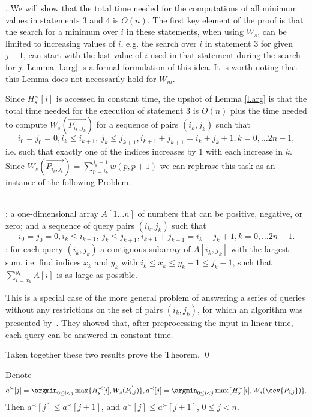.
We will show that the total time needed for the computations of all minimum values in statements 3 and 4 is $O(n)$.
The first key element of the proof is that the search for a minimum over $i$ 
in these statements, when using $W_s$, can be limited to increasing values of $i$, e.g. the search over $i$ in statement 3
for given $j+1$, can start with the last value of $i$ used in that statement during the 
search for $j$. Lemma \ref{l.arg} is a formal formulation of this idea.
It is worth noting that this Lemma does not necessarily hold for $W_m$.

Since $H_s^{\prec}[i]$ is accessed in constant time, the upshot of Lemma \ref{l.arg} 
is that the total time needed for the execution of statement 3 is $O(n)$ plus
the time needed to compute  $W_s(\vec{P_{i_k, j_k}})$ for a sequence  of pairs $(i_k,j_k)$ 
such that 
$$i_0=j_0=0, i_k\leq  i_{k+1},\  j_k \leq j_{k+1}, 
i_{k+1}+j_{k+1}=i_k+j_k+1,
k=0, \ldots 2n-1,$$
i.e. such that exactly one of the indices increases by 1 with each increase in $k$.
Since $W_s(\vec{P_{i_k, j_k}})=\sum_{p=i_k}^{j_k-1} w(p,p+1)$ we can rephrase
this task as an instance of the following Problem.
\begin{problem}\label{p.msmm}\ \\
	: a one-dimensional array $A[1\ldots n]$ of numbers
	that can be positive, negative, or zero; and a sequence of query pairs $(i_k,j_k)$ 
	such that 
	$$i_0=j_0=0, i_k\leq  i_{k+1},\  j_k \leq j_{k+1}, 
	i_{k+1}+j_{k+1}=i_k+j_k+1,
	k=0, \ldots 2n-1.$$
	: for each query $(i_k,j_k)$ a contiguous subarray of 
	$A[i_k,j_k]$ with the largest sum,
	i.e. find indices $x_k$ and 
	$y_k$ with $i_k \leq x_k\leq y_k-1\leq j_k-1$, such that 
	$ \sum_{i=x_k}^{y_k}A[i] $
	is as large as possible. 
\end{problem}

This is a special case of the more general problem of answering a series of queries without any restrictions on the set of pairs $(i_k,j_k)$, for which an algorithm was
 presented by~\cite{chen2007range}. They showed
that, after preprocessing the input
in linear time, each query can be answered in constant time.

Taken together these two results prove the Theorem.
\qed

\begin{lemma}\label{l.arg}
	Denote 
	$$a^{\succ}[j]=\argmin_{0\leq i <j} \max \{ H_s^{\prec}[i], W_s(\vec{P_{i, j}}) \},
	a^{\prec}[j]=\argmin_{0\leq i <j} \max \{ H_s^{\succ}[i], W_s(\cev{P_{i, j}}) \}.
	$$
	Then $a^{\prec}[j]\leq a^{\prec}[j+1]$, and $a^{\succ}[j]\leq a^{\succ}[j+1]$, $0\leq j <n$.
\end{lemma}


